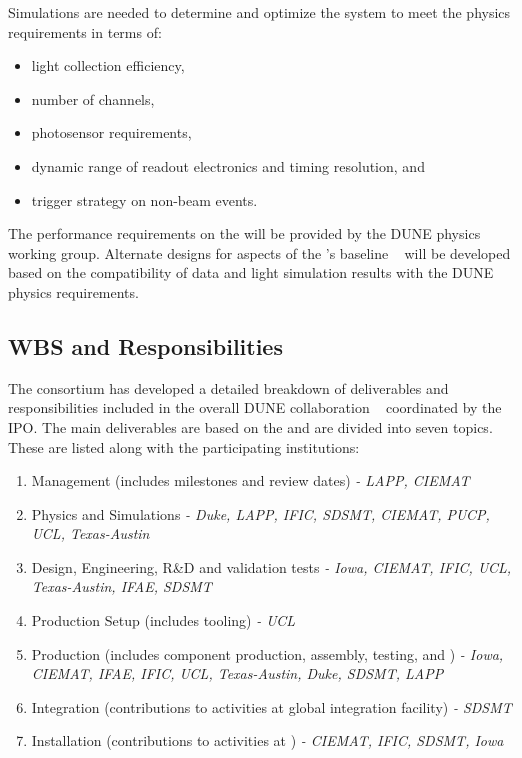 Simulations are needed to determine and optimize the \dual {} system to meet the physics requirements in terms of:
\begin{itemize}
\item light collection efficiency,
\item number of channels,
\item photosensor requirements,
\item dynamic range of readout electronics and timing resolution, and 
\item trigger strategy on non-beam events.
\end{itemize}

The performance requirements on the  will be provided by the DUNE physics working group. Alternate designs for aspects of the 's baseline %
~\cite{cdr-vol-4} %
 will be developed based on the compatibility of  data and  light simulation results with the DUNE physics requirements.

\subsection{WBS and Responsibilities}
\label{sec:fddp-pd-12.3}

The \dual {} consortium has developed a detailed breakdown of deliverables and responsibilities included in the overall DUNE collaboration ~\cite{bib:docdb5594} coordinated by the IPO. The main deliverables are based on the    and are divided into seven topics. These are listed along with the participating institutions: 

\begin{enumerate}
\item Management \dual {} (includes milestones and review dates) \textit{- LAPP, CIEMAT }
\item Physics and Simulations \textit{- Duke, LAPP, IFIC, SDSMT, CIEMAT, PUCP, UCL, Texas-Austin}
\item Design, Engineering, R\&D and validation tests \textit{- Iowa, CIEMAT, IFIC, UCL, Texas-Austin, IFAE, SDSMT}
\item Production Setup (includes tooling) \textit{- UCL}
\item Production (includes component production, assembly, testing, and ) \textit{- Iowa, CIEMAT, IFAE, IFIC, UCL, Texas-Austin, Duke, SDSMT, LAPP}
\item Integration (contributions to activities at global integration facility) \textit{- SDSMT}
\item Installation (contributions to activities at \surf) \textit{- CIEMAT, IFIC, SDSMT, Iowa}
\end{enumerate}


